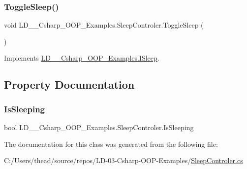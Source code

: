 \subsubsection{\texorpdfstring{Toggle\+Sleep()}{ToggleSleep()}}
{\footnotesize\ttfamily void L\+D\+\_\+\_\+\+Csharp\+\_\+\+O\+O\+P\+\_\+\+Examples.\+Sleep\+Controler.\+Toggle\+Sleep (\begin{DoxyParamCaption}{ }\end{DoxyParamCaption})}



Implements \mbox{\hyperlink{interface_l_d__03___csharp___o_o_p___examples_1_1_i_sleep_a51a16beac9cf61fd4d088e169790bd08}{L\+D\+\_\+\_\+\+Csharp\+\_\+\+O\+O\+P\+\_\+\+Examples.\+I\+Sleep}}.



\subsection{Property Documentation}
\mbox{\label{class_l_d__03___csharp___o_o_p___examples_1_1_sleep_controler_ae68167d3360f4f9b0a7bec48ab64e898}} 
\subsubsection{\texorpdfstring{Is\+Sleeping}{IsSleeping}}
{\footnotesize\ttfamily bool L\+D\+\_\+\_\+\+Csharp\+\_\+\+O\+O\+P\+\_\+\+Examples.\+Sleep\+Controler.\+Is\+Sleeping\hspace{0.3cm}{\ttfamily [get]}}



The documentation for this class was generated from the following file\+:\begin{DoxyCompactItemize}
\item 
C\+:/\+Users/thead/source/repos/\+L\+D-\/03-\/\+Csharp-\/\+O\+O\+P-\/\+Examples/\mbox{\hyperlink{_sleep_controler_8cs}{Sleep\+Controler.\+cs}}\end{DoxyCompactItemize}
